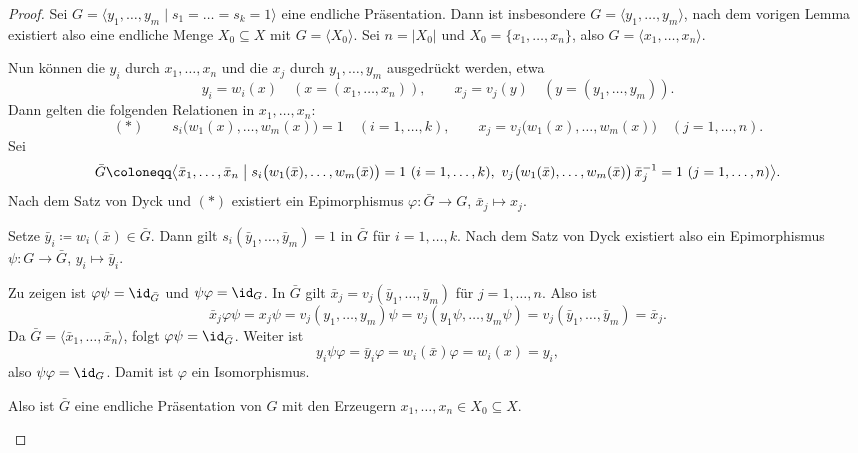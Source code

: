 \documentclass[11pt]{article}
\begin{document}
\begin{proof}
  Sei $G = \langle y_1, \dots, y_m \mid s_1 = \dots = s_k = 1 \rangle$ eine endliche Präsentation. Dann ist insbesondere $G = \langle y_1, \dots, y_m \rangle$, nach dem vorigen Lemma existiert also eine endliche Menge $X_0 \subseteq X$ mit $G = \langle X_0 \rangle$. Sei $n = \lvert X_0 \rvert$ und $X_0 = \{x_1, \dots, x_n\}$, also $G = \langle x_1, \dots, x_n \rangle$.


  Nun können die $y_i$ durch $x_1, \dots, x_n$ und die $x_j$ durch $y_1, \dots, y_m$ ausgedrückt werden, etwa
  \[ y_i = w_i(x) \quad (x = (x_1, \dots, x_n)), \qquad x_j = v_j(y) \quad (y = (y_1, \dots, y_m)). \]
  Dann gelten die folgenden Relationen in $x_1, \dots, x_n$:
  \[
    (\ast) \qquad s_i\bigl(w_1(x), \dots, w_m(x)\bigr) = 1 \quad (i = 1, \dots, k), \qquad x_j = v_j\bigl(w_1(x), \dots, w_m(x)\bigr) \quad (j = 1, \dots, n).
  \]
Sei
  \[ \bar{G} \coloneqq \bigl\langle \bar{x}_1, \dots, \bar{x}_n \bigm| s_i\bigl(w_1(\bar{x}), \dots, w_m(\bar{x})\bigr) = 1 \ (i = 1, \dots, k),\ v_j\bigl(w_1(\bar{x}), \dots, w_m(\bar{x})\bigr)\, \bar{x}_j^{-1} = 1 \ (j = 1, \dots, n) \bigr\rangle. \]
  Nach dem Satz von Dyck und $(\ast)$ existiert ein Epimorphismus $\varphi\colon \bar{G} \to G$, $\bar{x}_j \mapsto x_j$.

  Setze $\bar{y}_i \coloneqq w_i(\bar{x}) \in \bar{G}$. Dann gilt $s_i(\bar{y}_1, \dots, \bar{y}_m) = 1$ in $\bar{G}$ für $i = 1, \dots, k$. Nach dem Satz von Dyck existiert also ein Epimorphismus $\psi\colon G \to \bar{G}$, $y_i \mapsto \bar{y}_i$.

  Zu zeigen ist $\varphi\psi = \id_{\bar{G}}$ und $\psi\varphi = \id_G$. In $\bar{G}$ gilt $\bar{x}_j = v_j(\bar{y}_1, \dots, \bar{y}_m)$ für $j = 1, \dots, n$. Also ist
  \[ \bar{x}_j \varphi\psi = x_j \psi = v_j(y_1, \dots, y_m)\psi = v_j(y_1\psi, \dots, y_m\psi) = v_j(\bar{y}_1, \dots, \bar{y}_m) = \bar{x}_j. \]
  Da $\bar{G} = \langle \bar{x}_1, \dots, \bar{x}_n \rangle$, folgt $\varphi\psi = \id_{\bar{G}}$. Weiter ist
  \[ y_i \psi\varphi = \bar{y}_i \varphi = w_i(\bar{x})\varphi = w_i(x) = y_i, \]
  also $\psi\varphi = \id_G$. Damit ist $\varphi$ ein Isomorphismus.
\begin{ergaenzung}
  Also ist $\bar{G}$ eine endliche Präsentation von $G$ mit den Erzeugern $x_1, \dots, x_n \in X_0 \subseteq X$.
  \end{ergaenzung}
\end{proof}
\end{document}
